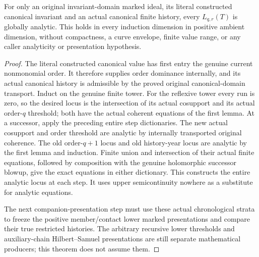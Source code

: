 \begin{theorem}
\label{hir:original-companion-history-year-global-analytic-producer}
\leanok
{}
For only an original invariant-domain marked ideal, its literal constructed
canonical invariant and an actual canonical finite history, every
$L_{q,r}(T)$ is globally analytic. This holds in every induction dimension in positive ambient dimension,
without compactness, a curve envelope, finite value range, or any caller
analyticity or presentation hypothesis.
\end{theorem}
\begin{proof}
The literal constructed canonical value has first entry the genuine current
nonmonomial order. It therefore supplies order dominance internally, and
its actual canonical history is admissible by the proved original
canonical-domain transport. Induct on the genuine finite tower. For the
reflexive tower every run is zero, so the desired locus is the intersection
of its actual cosupport and its actual order-$q$ threshold; both have the
actual coherent equations of the first lemma. At a successor, apply the
preceding entire step dictionaries. The new actual cosupport and order
threshold are analytic by internally transported original coherence.
The old order-$q+1$ locus and old history-year locus are analytic by the
first lemma and induction. Finite union and intersection of their actual
finite equations, followed by composition with the genuine holomorphic
successor blowup, give the exact equations in either dictionary. This
constructs the entire analytic locus at each step. It uses upper
semicontinuity nowhere as a substitute for analytic equations.

The next companion-presentation step must use these actual chronological
strata to freeze the positive member/contact lower marked presentations and
compare their true restricted histories. The arbitrary recursive lower
thresholds and auxiliary-chain Hilbert--Samuel presentations are still
separate mathematical producers; this theorem does not assume them.
\end{proof}
